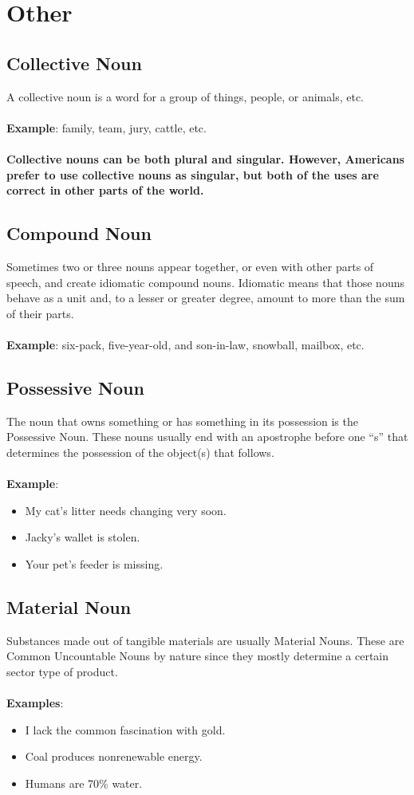\newpage
\section{Other}
\subsection{Collective Noun}
A collective noun is a word for a group of things, people, or animals, etc.\\\\
\textbf{Example}: family, team, jury, cattle, etc.\\\\
\textbf{Collective nouns can be both plural and singular. However, Americans prefer to use collective nouns as singular, but both of the uses are correct in other parts of the world.}

\subsection{Compound Noun}
Sometimes two or three nouns appear together, or even with other parts of speech, and create idiomatic compound nouns. Idiomatic means that those nouns behave as a unit and, to a lesser or greater degree, amount to more than the sum of their parts.\\\\
\textbf{Example}: six-pack, five-year-old, and son-in-law, snowball, mailbox, etc.

\newpage
\subsection{Possessive Noun}
The noun that owns something or has something in its possession is the Possessive Noun. These nouns usually end with an apostrophe before one “s” that determines the possession of the object(s) that follows. \\\\
\textbf{Example}:
\begin{itemize}
    \item My cat’s litter needs changing very soon.
    \item Jacky’s wallet is stolen.
    \item Your pet’s feeder is missing.
\end{itemize}

\subsection{Material Noun}
Substances made out of tangible materials are usually Material Nouns. These are Common Uncountable Nouns by nature since they mostly determine a certain sector type of product.\\\\
\textbf{Examples}:
\begin{itemize}
    \item I lack the common fascination with gold.
    \item Coal produces nonrenewable energy.
    \item Humans are 70\% water.
\end{itemize}


